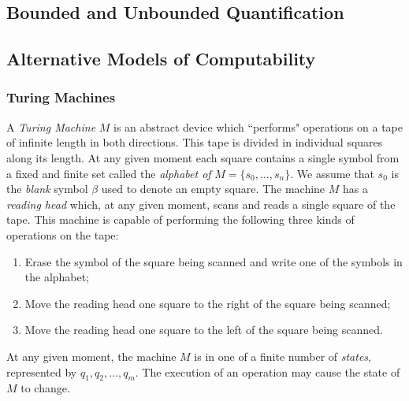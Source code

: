 
\subsection{Bounded and Unbounded Quantification}

\subsection{Alternative Models of Computability}
\subsubsection*{Turing Machines}

A \emph{Turing Machine} $M$ is an abstract device which ``performs" operations on a tape of infinite length in both directions. This tape is divided in individual squares along its length. At any given moment each square contains a single symbol from a fixed and finite set called the \emph{alphabet of} $M = \{ s_0, \ldots, s_n \}$. We assume that $s_0$ is the \emph{blank} symbol $\beta$ used to denote an empty square. The machine $M$ has a \emph{reading head} which, at any given moment, scans and reads a single square of the tape. This machine is capable of performing the following three kinds of operations on the tape:
\begin{enumerate}
\item Erase the symbol of the square being scanned and write one of the symbols in the alphabet;
\item Move the reading head one square to the right of the square being scanned;
\item Move the reading head one square to the left of the square being scanned.
\end{enumerate}
At any given moment, the machine $M$ is in one of a finite number of \emph{states}, represented by $q_1, q_2, \ldots, q_m$. The execution of an operation may cause the state of $M$ to change.


